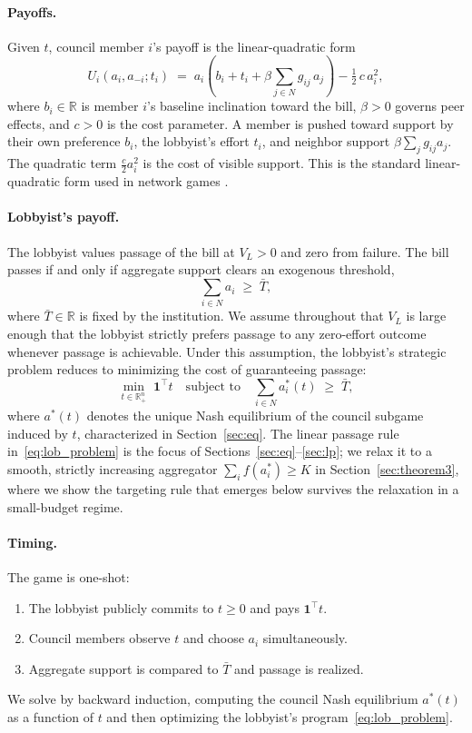 \documentclass[11pt,letterpaper]{article}
\theoremstyle{plain}
\theoremstyle{definition}
\theoremstyle{remark}
\begin{document}
\paragraph{Payoffs.} Given $t$, council member $i$'s payoff is the linear-quadratic form
\begin{equation}
U_i(a_i, a_{-i}; t_i) \;=\; a_i \!\left( b_i + t_i + \beta \sum_{j \in N} g_{ij}\, a_j \right) - \tfrac{1}{2}\, c\, a_i^2,
\label{eq:payoff}
\end{equation}
where $b_i \in \mathbb{R}$ is member $i$'s baseline inclination toward the bill, $\beta > 0$ governs peer effects, and $c > 0$ is the cost parameter. A member is pushed toward support by their own preference $b_i$, the lobbyist's effort $t_i$, and neighbor support $\beta \sum_j g_{ij} a_j$. The quadratic term $\tfrac{c}{2} a_i^2$ is the cost of visible support. This is the standard linear-quadratic form used in network games \citep{bcz2006, ggg2020}.

\paragraph{Lobbyist's payoff.} The lobbyist values passage of the bill at $V_L > 0$ and zero from failure. The bill passes if and only if aggregate support clears an exogenous threshold,
\[
\sum_{i \in N} a_i \;\geq\; \bar T,
\]
where $\bar T \in \mathbb{R}$ is fixed by the institution. We assume throughout that $V_L$ is large enough that the lobbyist strictly prefers passage to any zero-effort outcome whenever passage is achievable. Under this assumption, the lobbyist's strategic problem reduces to minimizing the cost of guaranteeing passage:
\begin{equation}
\min_{t \in \mathbb{R}^n_+} \; \mathbf{1}^\top t \quad \text{subject to} \quad \sum_{i \in N} a_i^*(t) \;\geq\; \bar T,
\label{eq:lob_problem}
\end{equation}
where $a^*(t)$ denotes the unique Nash equilibrium of the council subgame induced by $t$, characterized in Section~\ref{sec:eq}. The linear passage rule in~\eqref{eq:lob_problem} is the focus of Sections~\ref{sec:eq}--\ref{sec:lp}; we relax it to a smooth, strictly increasing aggregator $\sum_i f(a_i^*) \geq K$ in Section~\ref{sec:theorem3}, where we show the targeting rule that emerges below survives the relaxation in a small-budget regime.

\paragraph{Timing.} The game is one-shot:
\begin{enumerate}
\item[(i)] The lobbyist publicly commits to $t \geq 0$ and pays $\mathbf{1}^\top t$.
\item[(ii)] Council members observe $t$ and choose $a_i$ simultaneously.
\item[(iii)] Aggregate support is compared to $\bar T$ and passage is realized.
\end{enumerate}
We solve by backward induction, computing the council Nash equilibrium $a^*(t)$ as a function of $t$ and then optimizing the lobbyist's program~\eqref{eq:lob_problem}.
\end{document}
